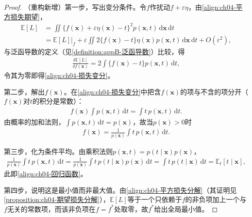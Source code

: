 \documentclass[../../main.tex]{subfiles}
\begin{document}
\begin{proof}
（重构新增）第一步，写出变分条件。令$f$作扰动$f+\varepsilon\eta$，由\eqref{align:ch04-平方损失期望}，
\begin{align*}
  \mathbb{E}[L]&=\iint\bigl\{f(\boldsymbol{x})+\varepsilon\eta(\boldsymbol{x})-t\bigr\}^2p(\boldsymbol{x},t)\,\mathrm{d}\boldsymbol{x}\,\mathrm{d}t\\
  &=\mathbb{E}[L]\big|_{f}+\varepsilon\iint2\{f(\boldsymbol{x})-t\}\eta(\boldsymbol{x})p(\boldsymbol{x},t)\,\mathrm{d}\boldsymbol{x}\,\mathrm{d}t+O(\varepsilon^2),
\end{align*}
与泛函导数的定义（见\cref{definition:appB-泛函导数}）比较，得
\begin{align*}
  \frac{\delta\mathbb{E}[L]}{\delta f(\boldsymbol{x})}=2\int\{f(\boldsymbol{x})-t\}p(\boldsymbol{x},t)\,\mathrm{d}t,
\end{align*}
令其为零即得\eqref{align:ch04-损失变分}。

第二步，解出$f(\boldsymbol{x})$。在\eqref{align:ch04-损失变分}中把含$f(\boldsymbol{x})$的项与不含的项分开（$f(\boldsymbol{x})$对$t$的积分是常数）：
\begin{align*}
  f(\boldsymbol{x})\int p(\boldsymbol{x},t)\,\mathrm{d}t=\int t\,p(\boldsymbol{x},t)\,\mathrm{d}t.
\end{align*}
由概率的加和法则，$\int p(\boldsymbol{x},t)\,\mathrm{d}t=p(\boldsymbol{x})$，故当$p(\boldsymbol{x})>0$时
\begin{align*}
  f(\boldsymbol{x})=\frac{1}{p(\boldsymbol{x})}\int t\,p(\boldsymbol{x},t)\,\mathrm{d}t.
\end{align*}

第三步，化为条件平均。由乘积法则$p(\boldsymbol{x},t)=p(t\mid\boldsymbol{x})p(\boldsymbol{x})$，
\begin{align*}
  \frac{1}{p(\boldsymbol{x})}\int t\,p(\boldsymbol{x},t)\,\mathrm{d}t
  =\frac{1}{p(\boldsymbol{x})}\int t\,p(t\mid\boldsymbol{x})p(\boldsymbol{x})\,\mathrm{d}t
  =\int t\,p(t\mid\boldsymbol{x})\,\mathrm{d}t=\mathbb{E}_t[t\mid\boldsymbol{x}],
\end{align*}
此即\eqref{align:ch04-回归函数}。

第四步，说明这是最小值而非最大值。由\eqref{align:ch04-平方损失分解}（其证明见\cref{proposition:ch04-期望损失分解}），$\mathbb{E}[L]$等于一个只依赖于$f$的非负项加上一个与$f$无关的常数项，而该非负项在$f=f^*$处取零，故$f^*$给出全局最小值。
\end{proof}
\end{document}
